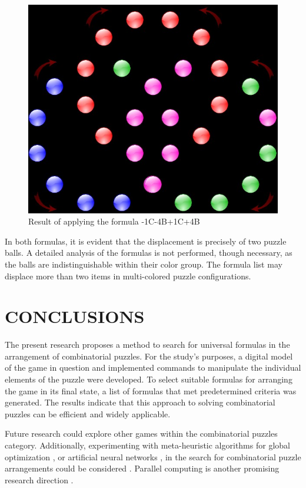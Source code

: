 \documentclass[a4paper,twocolumn,10pt]{article}
\begin{document}
\begin{figure}
	\centering
	\includegraphics[width=1.0\linewidth]{figure03.png}
	\caption{Result of applying the formula -1C-4B+1C+4B}
	\label{figure03}
\end{figure}

In both formulas, it is evident that the displacement is precisely of two puzzle balls. A detailed analysis of the formulas is not performed, though necessary, as the balls are indistinguishable within their color group. The formula list may displace more than two items in multi-colored puzzle configurations.

\section{CONCLUSIONS}

The present research proposes a method to search for universal formulas in the arrangement of combinatorial puzzles. For the study's purposes, a digital model of the game in question and implemented commands to manipulate the individual elements of the puzzle were developed. To select suitable formulas for arranging the game in its final state, a list of formulas that met predetermined criteria was generated. The results indicate that this approach to solving combinatorial puzzles can be efficient and widely applicable.

Future research could explore other games within the combinatorial puzzles category. Additionally, experimenting with meta-heuristic algorithms for global optimization \cite{4219047,wolf1998study}, or artificial neural networks \cite{kajiura1989solving}, in the search for combinatorial puzzle arrangements could be considered \cite{6802604}. Parallel computing is another promising research direction \cite{hukmani2021solving}.
\end{document}
